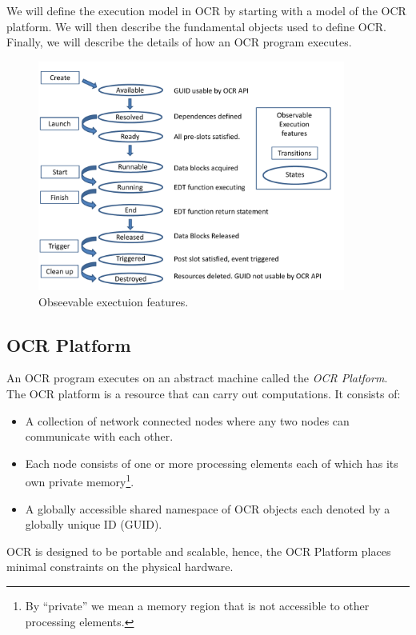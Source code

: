 We will define the execution model in OCR by starting with a model of
the OCR platform. We will then describe the fundamental objects used
to define OCR. Finally, we will describe the details of how an OCR
program executes.


\begin{figure}
\centering
 \includegraphics[width=0.9\textwidth]{EDT_exec}
\caption{Obseevable exectuion features.}
\label{fig:EDTexec}
\end{figure}
%
%
%

\subsection{OCR Platform}
\label{sec:OCRPlatform}

An OCR program executes on an abstract machine called the \emph{OCR
Platform}.  The OCR platform is a resource that can carry out
computations. It consists of:
\begin{itemize}
\item A collection of network connected nodes where any two nodes can
communicate with each other.
\item Each node consists of one or more processing elements each of
which has its own private memory\footnote{By ``private'' we mean a
memory region that is not accessible to other processing
elements.}.
\item A globally accessible shared namespace of OCR objects each
denoted by a globally unique ID (GUID).
\end{itemize}
OCR is designed to be portable and scalable, hence, the OCR Platform
places minimal constraints on the physical hardware.

